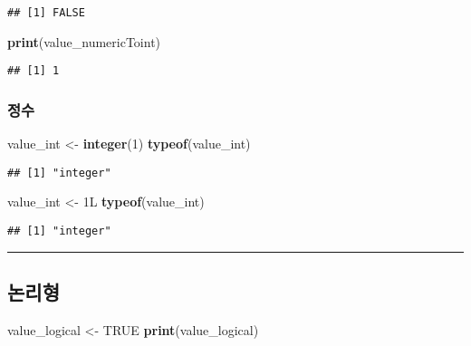 \documentclass[
]{article}
\newenvironment{Shaded}{\begin{snugshade}}{\end{snugshade}}
\newcommand{\ConstantTok}[1]{\textcolor[rgb]{0.56,0.35,0.01}{#1}}
\newcommand{\DecValTok}[1]{\textcolor[rgb]{0.00,0.00,0.81}{#1}}
\newcommand{\FunctionTok}[1]{\textcolor[rgb]{0.13,0.29,0.53}{\textbf{#1}}}
\newcommand{\NormalTok}[1]{#1}
\newcommand{\OtherTok}[1]{\textcolor[rgb]{0.56,0.35,0.01}{#1}}
\begin{document}
\begin{verbatim}
## [1] FALSE
\end{verbatim}

\begin{Shaded}
\begin{Highlighting}[]
\FunctionTok{print}\NormalTok{(value\_numericToint)}
\end{Highlighting}
\end{Shaded}

\begin{verbatim}
## [1] 1
\end{verbatim}

\hypertarget{uxc815uxc218}{%
\subsubsection{정수}\label{uxc815uxc218}}

\begin{Shaded}
\begin{Highlighting}[]
\NormalTok{value\_int }\OtherTok{\textless{}{-}} \FunctionTok{integer}\NormalTok{(}\DecValTok{1}\NormalTok{)}
\FunctionTok{typeof}\NormalTok{(value\_int)}
\end{Highlighting}
\end{Shaded}

\begin{verbatim}
## [1] "integer"
\end{verbatim}

\begin{Shaded}
\begin{Highlighting}[]
\NormalTok{value\_int }\OtherTok{\textless{}{-}}\NormalTok{ 1L}
\FunctionTok{typeof}\NormalTok{(value\_int)}
\end{Highlighting}
\end{Shaded}

\begin{verbatim}
## [1] "integer"
\end{verbatim}

\begin{center}\rule{0.5\linewidth}{0.5pt}\end{center}

\hypertarget{uxb17cuxb9acuxd615}{%
\subsection{논리형}\label{uxb17cuxb9acuxd615}}

\begin{Shaded}
\begin{Highlighting}[]
\NormalTok{value\_logical }\OtherTok{\textless{}{-}} \ConstantTok{TRUE}
\FunctionTok{print}\NormalTok{(value\_logical)}
\end{Highlighting}
\end{Shaded}
\end{document}
